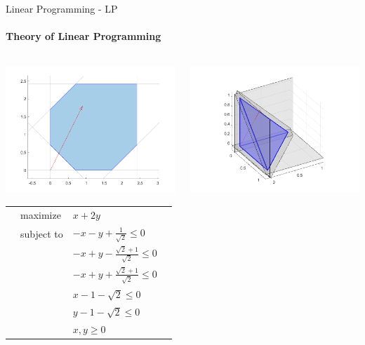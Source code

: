\documentclass{beamer}
\begin{document}
	\begin{frame}{Linear Programming - LP}
		\framesubtitle{Theory of Linear Programming}
		\begin{columns}[T]
			\begin{column}{0.5\textwidth}
				\includegraphics[width=\textwidth]{images/slides_ex1_2d.png}
				\small
				\begin{tabularx}{\textwidth}{X l l X}
					& maximize		& $x + 2y$		& \\
					& subject to	& $-x-y+\frac{1}{\sqrt{2}}\leq 0$	& \\
					& 				& $-x+y-\frac{\sqrt{2}+1}{\sqrt{2}}\leq 0$ & \\
					& 				& $-x+y+\frac{\sqrt{2}+1}{\sqrt{2}}\leq 0$ & \\
					& 				& $x-1-\sqrt{2}\leq 0$ & \\
					& 				& $y-1-\sqrt{2}\leq 0$ & \\
					&				& $x, y\geq 0$ &
				\end{tabularx}
			\end{column}
			\begin{column}{0.5\textwidth}
				\includegraphics[width=\textwidth]{images/slides_ex2_3d.png}

\end{column}
\end{columns}
\end{frame}
\end{document}
